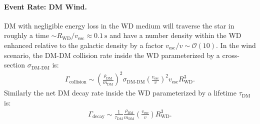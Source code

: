 \documentclass[twocolumn, preprintnumbers,amsmath,amssymb,prd, superscriptaddress]{revtex4}
\newcommand{\OO}{\mathcal{O}}
\def\r{\right)}
\def\l{\left(}
\begin{document}
\paragraph{Event Rate: DM Wind.}
DM with negligible energy loss in the WD medium will traverse the star in roughly a time $\sim R_\text{WD}/v_\text{esc} \approx 0.1 ~\text{s}$ and have a number density within the WD enhanced relative to the galactic density by a factor $v_\text{esc}/v \sim \OO(10)$.
In the wind scenario, the DM-DM collision rate inside the WD parameterized by a cross-section $\sigma_\text{DM-DM}$ is:
\begin{align}
  \Gamma_\text{collision}
  \sim \l \frac{\rho_\text{DM}}{m_\text{DM}} \r^2 \sigma_\text{DM-DM} \l \frac{v_\text{esc}}{v}\r^2 v_\text{esc} R_\text{WD}^3.
  \label{eq:collisionDM}
\end{align}
Similarly the net DM decay rate inside the WD parameterized by a lifetime $\tau_\text{DM}$ is:
\begin{align}
 \Gamma_\text{decay}
  \sim \frac{1}{\tau_\text{DM}} \frac{\rho_{\text{DM}}}{m_\text{DM}} \l \frac{v_\text{esc}}{v}\r R_\text{WD}^3.
  \label{eq:decayDM}
\end{align}
\end{document}
